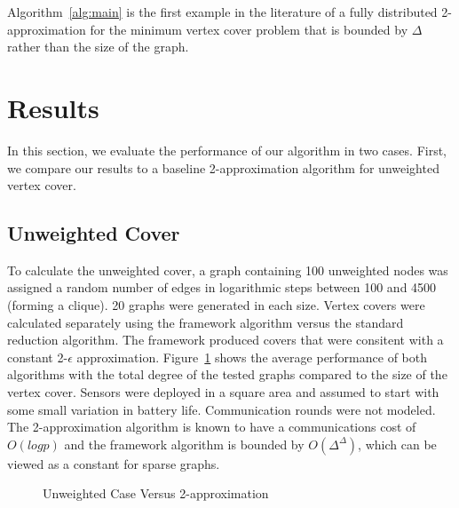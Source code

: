 \documentclass[conference, 11pt]{IEEEtran}
\theoremstyle{definition}
\begin{document}
Algorithm~\ref{alg:main} is the first example in the literature of a fully distributed 2-approximation for the minimum vertex cover problem that is bounded by $\Delta$ rather than the size of the graph.\cite{1435381}

\section{Results} 
In this section, we evaluate the performance of our algorithm in two cases. First, we compare our results to a baseline 2-approximation algorithm for unweighted vertex cover.\cite{500824} 
\subsection{Unweighted Cover}
To calculate the unweighted cover, a graph containing 100 unweighted nodes was assigned a random number of edges in logarithmic steps between 100 and 4500 (forming a clique). 20 graphs were generated in each size. Vertex covers were calculated separately using the framework algorithm versus the standard reduction algorithm. The framework produced covers that were consitent with a constant 2-$\epsilon$ approximation. Figure~\ref{fig:unweight_covers} shows the average performance of both algorithms with the total degree of the tested graphs compared to the size of the vertex cover. Sensors were deployed in a square area and assumed to start with some small variation in battery life. Communication rounds were not modeled. The 2-approximation algorithm is known to have a communications cost of $O(log p)$ and the framework algorithm is bounded by $O(\Delta^\Delta)$, which can be viewed as a constant for sparse graphs.
\begin{center}
\begin{figure}[width=2in]
  \label{fig:unweight_covers}
  \caption{Unweighted Case Versus 2-approximation}
  
\end{figure}	
\end{center}

\end{document}
